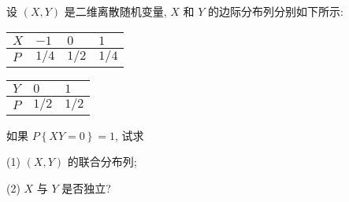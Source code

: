    \begin{example}
   	设 $(X,Y)$ 是二维离散随机变量, $X$ 和 $Y$ 的边际分布列分别如下所示:
   	\begin{table}[h]
   		\centering
   		\begin{tabularx}{0.4\textwidth}{Z|ZZZ}
   			\hline
   			$X$ & $-1$ & $0$ & $1$\\
   			\hline
   			$P$ & $1/4$ & $1/2$ & $1/4$\\
   			\hline
   		\end{tabularx}
   	    \qquad
   	    \begin{tabularx}{0.4\textwidth}{Z|ZZ}
   	    	\hline
   	    	$Y$ & $0$ & $1$\\
   	    	\hline
   	    	$P$ & $1/2$ & $1/2$\\
   	    	\hline
   	    \end{tabularx}
   	\end{table}
   如果 $P\left\{XY=0\right\}=1$, 试求
   
   (1) $(X,Y)$ 的联合分布列;
   
   (2) $X$ 与 $Y$ 是否独立?

   \end{example}
